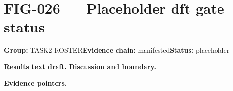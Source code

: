 \clearpage
\section{FIG-026 --- Placeholder dft gate status}
\label{figpage:fig-026}
\textbf{Group:} TASK2-ROSTER\quad \textbf{Evidence chain:} manifested\quad \textbf{Status:} placeholder

\textbf{Results text draft.} 
\textbf{Discussion and boundary.} 


\textbf{Evidence pointers.}



\vfill
